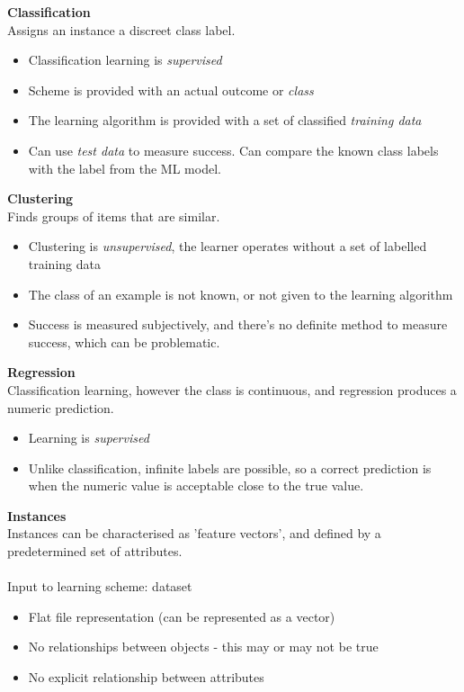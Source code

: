 \documentclass[a4paper,10pt]{article}
\begin{document}
\textcolor{Periwinkle}{\textbf{Classification}} \\
Assigns an instance a discreet class label. 
\begin{itemize}
	\item Classification learning is \emph{supervised}
	\item Scheme is provided with an actual outcome or \emph{class} 
	\item The learning algorithm is provided with a set of classified \emph{training data} 
	\item Can use \emph{test data} to measure success. Can compare the known class labels with the label from the ML model. \\
\end{itemize}
\textcolor{Periwinkle}{\textbf{Clustering}} \\
Finds groups of items that are similar. 
\begin{itemize}
	\item Clustering is \emph{unsupervised}, the learner operates without a set of labelled training data 
	\item The class of an example is not known, or not given to the learning algorithm 
	\item Success is measured subjectively, and there's no definite method to measure success, which can be problematic. \\
\end{itemize}
\textcolor{Periwinkle}{\textbf{Regression}}\\
Classification learning, however the class is continuous, and regression produces a numeric prediction.
\begin{itemize}
	\item Learning is \emph{supervised}
	\item Unlike classification, infinite labels are possible, so a correct prediction is when the numeric value is acceptable close to the true value. \\ 
\end{itemize}
\newpage
\noindent \textcolor{Periwinkle}{\textbf{Instances}}\\
Instances can be characterised as 'feature vectors', and defined by a predetermined set of attributes. \\\\
Input to learning scheme: dataset 
\begin{itemize}
	\item Flat file representation (can be represented as a vector) 
	\item No relationships between objects - this may or may not be true
	\item No explicit relationship between attributes 
\end{itemize}
\end{document}
